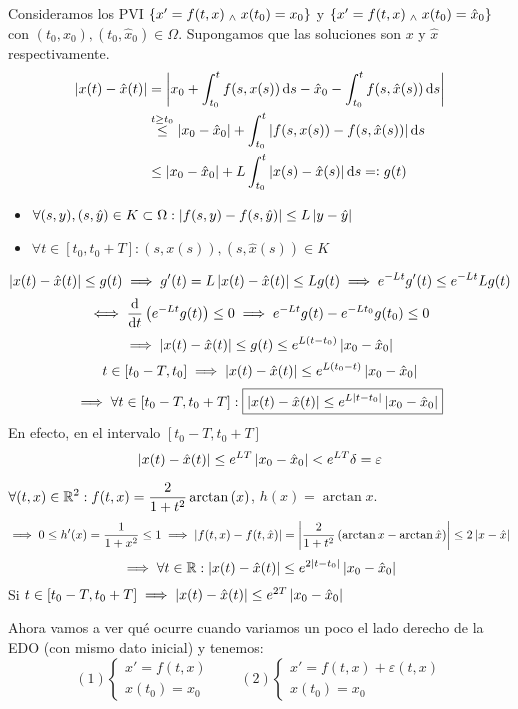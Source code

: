 Consideramos los PVI $\{x'=f(t, x) \; _{\wedge} \; x(t_0) = x_0\}$ y $\{x'=f(t, x) \; _{\wedge} \; x(t_0) = \hat{x}_0\}$ con $(t_0, x_0), (t_0, \hat{x}_0) \in \Omega$. Supongamos que las soluciones son $x$ y $\hat{x}$ respectivamente.
\[\begin{aligned}
		\abs{x(t) - \hat{x}(t)} & = \abs{x_0 + \int_{t_0}^{t} f(s, x(s)) \odif{s} - \hat{x}_0 - \int_{t_0}^{t} f(s, \hat{x}(s)) \odif{s}}        \\
		                        & \stackrel{t\geq t_0}{\leq} \abs{x_0 - \hat{x}_0} + \int_{t_0}^{t} \abs{f(s, x(s)) - f(s, \hat{x}(s))} \odif{s} \\
		                        & \leq \abs{x_0 - \hat{x}_0} + L\int_{t_0}^{t} \abs{x(s) - \hat{x}(s)} \odif{s} \eqdef g(t)
	\end{aligned}\]
\begin{itemize}
	\item $\forall (s, y), (s, \hat{y}) \in K\subset \Omega : \left|f(s, y) - f(s, \hat{y})\right| \leq L \left|y-\hat{y}\right|$
	\item $\forall t \in [t_0, t_0 + T] : (s, x(s)), (s, \hat{x}(s)) \in K$
\end{itemize}
\[\left|x(t) - \hat{x}(t)\right| \leq g(t) \implies g'(t) = L\left|x(t) - \hat{x}(t)\right| \leq L g(t)\implies e^{-Lt}g'(t) \leq e^{-Lt}Lg(t) \]
\[\iff \odv{}{t} \left(e^{-Lt} g(t)\right) \leq 0 \implies e^{-Lt}g(t) - e^{-Lt_0}g(t_0) \leq 0\]
\[\implies \left|x(t) - \hat{x}(t)\right| \leq g(t) \leq e^{L(t-t_0)} \left|x_0-\hat{x}_0\right|\]
\[t\in [t_0 - T, t_0] \implies \left|x(t) - \hat{x}(t)\right| \leq e^{L(t_0-t)} \left|x_0-\hat{x}_0\right|\]
\[\implies \forall t \in [t_0 - T, t_0+T] : \boxed{\left|x(t) - \hat{x}(t)\right| \leq e^{L\left|t-t_0\right|} \left|x_0-\hat{x}_0\right|}\]
En efecto, en el intervalo $[t_0-T, t_0+T]$
\[\left|x(t) - \hat{x}(t)\right| \leq e^{LT}\left|x_0-\hat{x}_0\right| < e^{LT}\delta = \varepsilon\]

\begin{ejem}
	$\displaystyle \forall (t, x) \in \mathbb{R}^2 : f(t, x) = \frac{2}{1+t^2} \arctan{(x)}$, $h(x) = \arctan{x}$.
	\[\implies 0 \leq h'(x) = \frac{1}{1+x^2} \leq 1 \implies \left|f(t, x) - f(t, \hat{x})\right| = \left|\frac{2}{1+t^2} \left(\arctan{x} - \arctan{\hat{x}}\right)\right| \leq 2\left|x-\hat{x}\right|\]
	\[\implies \forall t \in \mathbb{R} : \left|x(t) - \hat{x}(t)\right| \leq e^{2\left|t-t_0\right|}\left|x_0 - \hat{x}_0\right|\]
	Si $t\in [t_0 - T, t_0 + T] \implies \left|x(t) - \hat{x}(t)\right| \leq e^{2T}\left|x_0 - \hat{x}_0\right|$
\end{ejem}


Ahora vamos a ver qué ocurre cuando variamos un poco el lado derecho de la EDO (con mismo dato inicial) y tenemos: \[(1) \begin{cases}
		x'=f(t,x) \\ x(t_0)=x_0
	\end{cases} \qquad (2) \begin{cases}
		x'=f(t,x)+\varepsilon(t,x) \\ x(t_0)=x_0
	\end{cases}\]

